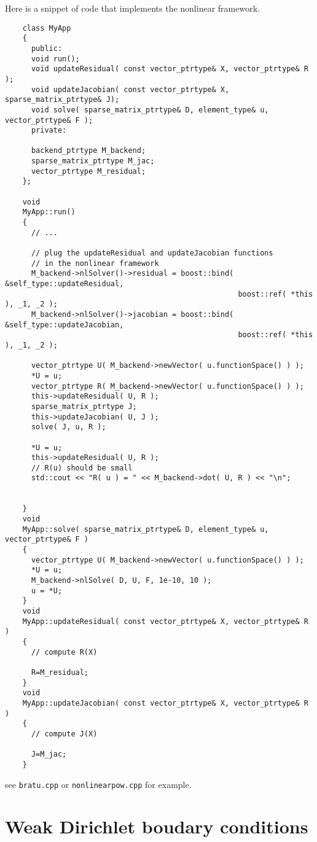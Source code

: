   Here is a snippet of code that implements the nonlinear framework.
  \begin{lstlisting}
    class MyApp
    {
      public:
      void run();
      void updateResidual( const vector_ptrtype& X, vector_ptrtype& R );
      void updateJacobian( const vector_ptrtype& X, sparse_matrix_ptrtype& J);
      void solve( sparse_matrix_ptrtype& D, element_type& u, vector_ptrtype& F );
      private:

      backend_ptrtype M_backend;
      sparse_matrix_ptrtype M_jac;
      vector_ptrtype M_residual;
    };

    void
    MyApp::run()
    {
      // ...

      // plug the updateResidual and updateJacobian functions
      // in the nonlinear framework
      M_backend->nlSolver()->residual = boost::bind( &self_type::updateResidual,
                                                     boost::ref( *this ), _1, _2 );
      M_backend->nlSolver()->jacobian = boost::bind( &self_type::updateJacobian,
                                                     boost::ref( *this ), _1, _2 );

      vector_ptrtype U( M_backend->newVector( u.functionSpace() ) );
      *U = u;
      vector_ptrtype R( M_backend->newVector( u.functionSpace() ) );
      this->updateResidual( U, R );
      sparse_matrix_ptrtype J;
      this->updateJacobian( U, J );
      solve( J, u, R );

      *U = u;
      this->updateResidual( U, R );
      // R(u) should be small
      std::cout << "R( u ) = " << M_backend->dot( U, R ) << "\n";


    }
    void
    MyApp::solve( sparse_matrix_ptrtype& D, element_type& u, vector_ptrtype& F )
    {
      vector_ptrtype U( M_backend->newVector( u.functionSpace() ) );
      *U = u;
      M_backend->nlSolve( D, U, F, 1e-10, 10 );
      u = *U;
    }
    void
    MyApp::updateResidual( const vector_ptrtype& X, vector_ptrtype& R )
    {
      // compute R(X)

      R=M_residual;
    }
    void
    MyApp::updateJacobian( const vector_ptrtype& X, vector_ptrtype& R )
    {
      // compute J(X)

      J=M_jac;
    }
  \end{lstlisting}
  see \texttt{bratu.cpp} or \texttt{nonlinearpow.cpp} for example.


\section{Weak Dirichlet boudary conditions}
\label{sec:weak-dirichl-boud}

